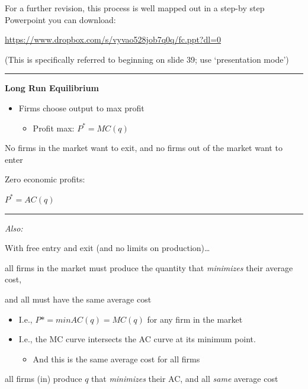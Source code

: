 \documentclass[]{article}
\providecommand{\tightlist}{%
  \setlength{\itemsep}{0pt}\setlength{\parskip}{0pt}}
\begin{document}
For a further revision, this process is well mapped out in a step-by step Powerpoint you can download:

\url{https://www.dropbox.com/s/vyvao528job7q0q/fc.ppt?dl=0}

(This is specifically referred to beginning on slide 39; use `presentation mode')

\begin{center}\rule{0.5\linewidth}{\linethickness}\end{center}

\textbf{Long Run Equilibrium}

\begin{itemize}
\tightlist
\item
  Firms choose output to max profit

  \begin{itemize}
  \tightlist
  \item
    Profit max: \(P^* = MC(q)\)
  \end{itemize}
\end{itemize}

No firms in the market want to exit, and no firms out of the market want to enter

Zero economic profits:

\(P^* = AC(q)\)

\begin{center}\rule{0.5\linewidth}{\linethickness}\end{center}

\emph{Also:}

With free entry and exit (and no limits on production)\ldots{}

all firms in the market must produce the quantity that \emph{minimizes} their average cost,

and all must have the same average cost

\begin{itemize}
\tightlist
\item
  I.e., \(P* = min AC(q) = MC(q)\) for any firm in the market
\item
  I.e., the MC curve intersects the AC curve at its minimum point.

  \begin{itemize}
  \tightlist
  \item
    And this is the same average cost for all firms
  \end{itemize}
\end{itemize}

all firms (in) produce \(q\) that \emph{minimizes} their AC, and all \emph{same} average cost
\end{document}
